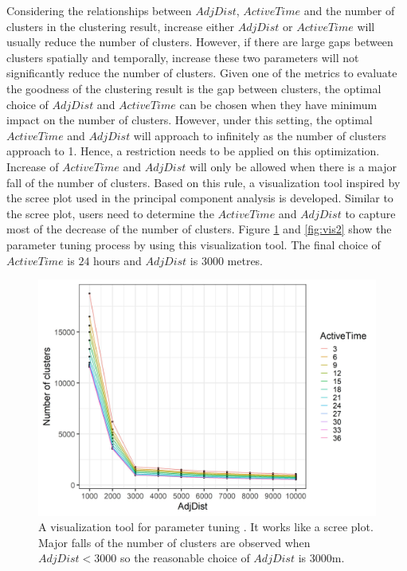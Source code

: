 Considering the relationships between \(AdjDist\), \(ActiveTime\) and
the number of clusters in the clustering result, increase either
\(AdjDist\) or \(ActiveTime\) will usually reduce the number of
clusters. However, if there are large gaps between clusters spatially
and temporally, increase these two parameters will not significantly
reduce the number of clusters. Given one of the metrics to evaluate the
goodness of the clustering result is the gap between clusters, the
optimal choice of \(AdjDist\) and \(ActiveTime\) can be chosen when they
have minimum impact on the number of clusters. However, under this
setting, the optimal \(ActiveTime\) and \(AdjDist\) will approach to
infinitely as the number of clusters approach to 1. Hence, a restriction
needs to be applied on this optimization. Increase of \(ActiveTime\) and
\(AdjDist\) will only be allowed when there is a major fall of the
number of clusters. Based on this rule, a visualization tool inspired by
the scree plot used in the principal component analysis is developed.
Similar to the scree plot, users need to determine the \(ActiveTime\)
and \(AdjDist\) to capture most of the decrease of the number of
clusters. Figure \ref{fig:vis1} and \ref{fig:vis2} show the parameter
tuning process by using this visualization tool. The final choice of
\(ActiveTime\) is \(24\) hours and \(AdjDist\) is \(3000\) metres.

\begin{Schunk}
\begin{figure}

{\centering \includegraphics[width=0.8\linewidth]{figures/clustering_tuning_1} 

}

\caption[A visualization tool for parameter tuning ]{A visualization tool for parameter tuning . It works like a scree plot. Major falls of the number of clusters are observed when $AdjDist < 3000$ so the reasonable choice of $AdjDist$ is 3000m.}\label{fig:vis1}
\end{figure}
\end{Schunk}

